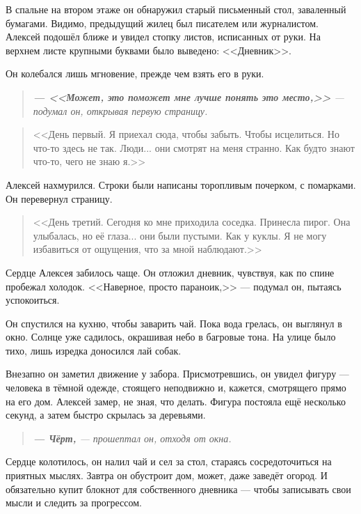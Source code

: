 \documentclass[12pt,a4paper]{book}
\newenvironment{dialogue}{\begin{quote}\itshape}{\end{quote}} %
\begin{document}
В спальне на втором этаже он обнаружил старый письменный стол, заваленный бумагами. Видимо, предыдущий жилец был писателем или журналистом. Алексей подошёл ближе и увидел стопку листов, исписанных от руки. На верхнем листе крупными буквами было выведено: <<Дневник>>.

Он колебался лишь мгновение, прежде чем взять его в руки.
\begin{dialogue}
\textbf{--- <<Может, это поможет мне лучше понять это место,>>} --- подумал он, открывая первую страницу.
\end{dialogue}

\begin{quote}
<<День первый. Я приехал сюда, чтобы забыть. Чтобы исцелиться. Но что-то здесь не так. Люди... они смотрят на меня странно. Как будто знают что-то, чего не знаю я.>>
\end{quote}

Алексей нахмурился. Строки были написаны торопливым почерком, с помарками. Он перевернул страницу.
\begin{quote}
<<День третий. Сегодня ко мне приходила соседка. Принесла пирог. Она улыбалась, но её глаза... они были пустыми. Как у куклы. Я не могу избавиться от ощущения, что за мной наблюдают.>>
\end{quote}

Сердце Алексея забилось чаще. Он отложил дневник, чувствуя, как по спине пробежал холодок. <<Наверное, просто параноик,>> --- подумал он, пытаясь успокоиться.

Он спустился на кухню, чтобы заварить чай. Пока вода грелась, он выглянул в окно. Солнце уже садилось, окрашивая небо в багровые тона. На улице было тихо, лишь изредка доносился лай собак.

Внезапно он заметил движение у забора. Присмотревшись, он увидел фигуру --- человека в тёмной одежде, стоящего неподвижно и, кажется, смотрящего прямо на его дом. Алексей замер, не зная, что делать. Фигура постояла ещё несколько секунд, а затем быстро скрылась за деревьями.

\begin{dialogue}
\textbf{--- Чёрт,} --- прошептал он, отходя от окна.
\end{dialogue}

Сердце колотилось, он налил чай и сел за стол, стараясь сосредоточиться на приятных мыслях. Завтра он обустроит дом, может, даже заведёт огород. И обязательно купит блокнот для собственного дневника --- чтобы записывать свои мысли и следить за прогрессом.
\end{document}

